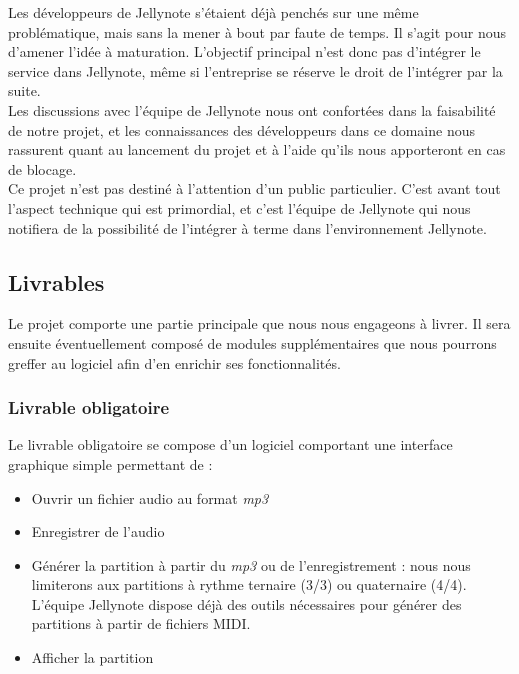 \documentclass[12pt]{article}
\begin{document}
Les développeurs de Jellynote s’étaient déjà penchés sur une même problématique, mais sans la mener à bout par faute de temps. Il s’agit pour nous d’amener l’idée à maturation. L’objectif principal n’est donc pas d’intégrer le service dans Jellynote, même si l’entreprise se réserve le droit de l’intégrer par la suite.\\

Les discussions avec l’équipe de Jellynote nous ont confortées dans la faisabilité de notre projet, et les connaissances des développeurs dans ce domaine nous rassurent quant au lancement du projet et à l’aide qu’ils nous apporteront en cas de blocage.\\

Ce projet n’est pas destiné à l’attention d’un public particulier. C’est avant tout l’aspect technique qui est primordial, et c’est l’équipe de Jellynote qui nous notifiera de la possibilité de l’intégrer à terme dans l’environnement Jellynote.\\

\newpage
\subsection{Livrables}
Le projet comporte une partie principale que nous nous engageons à livrer. Il sera ensuite éventuellement composé de modules supplémentaires que nous pourrons greffer au logiciel afin d’en enrichir ses fonctionnalités.\\

\subsubsection{Livrable obligatoire}

Le livrable obligatoire se compose d’un logiciel comportant une interface graphique simple permettant de :\\
\begin{itemize}
\item Ouvrir un fichier audio au format \emph{mp3}
\item Enregistrer de l’audio
\item Générer la partition à partir du \emph{mp3} ou de l’enregistrement : nous nous limiterons aux partitions à rythme ternaire (3/3) ou quaternaire (4/4).\\
L’équipe Jellynote dispose déjà des outils nécessaires pour générer des partitions à partir de fichiers MIDI.
\item Afficher la partition
\end{itemize}
\end{document}
